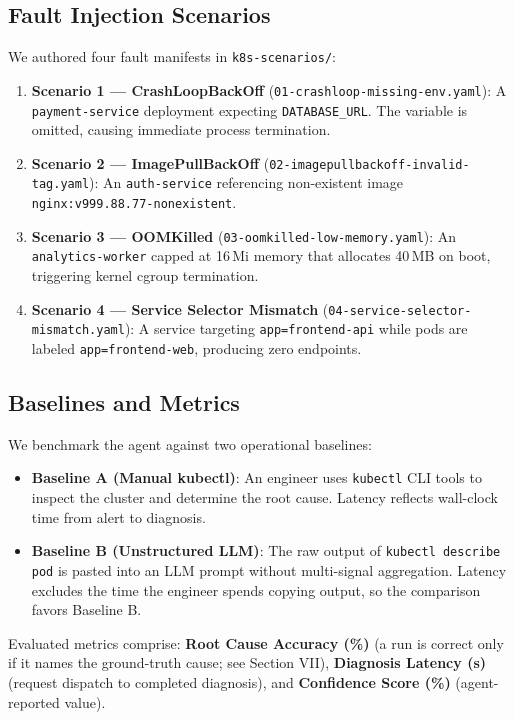 \documentclass[12pt,onecolumn,draftclsnofoot]{IEEEtran}
\begin{document}
\subsection{Fault Injection Scenarios}
We authored four fault manifests in \texttt{k8s-scenarios/}:
\begin{enumerate}
  \item \textbf{Scenario 1 — CrashLoopBackOff} (\texttt{01-crashloop-missing-env.yaml}): A \texttt{payment-service} deployment expecting \texttt{DATABASE\_URL}. The variable is omitted, causing immediate process termination.
  \item \textbf{Scenario 2 — ImagePullBackOff} (\texttt{02-imagepullbackoff-invalid-tag.yaml}): An \texttt{auth-service} referencing non-existent image \texttt{nginx:v999.88.77-nonexistent}.
  \item \textbf{Scenario 3 — OOMKilled} (\texttt{03-oomkilled-low-memory.yaml}): An \texttt{analytics-worker} capped at 16\,Mi memory that allocates 40\,MB on boot, triggering kernel cgroup termination.
  \item \textbf{Scenario 4 — Service Selector Mismatch} (\texttt{04-service-selector-mismatch.yaml}): A service targeting \texttt{app=frontend-api} while pods are labeled \texttt{app=frontend-web}, producing zero endpoints.
\end{enumerate}

\subsection{Baselines and Metrics}
We benchmark the agent against two operational baselines:
\begin{itemize}
  \item \textbf{Baseline A (Manual kubectl)}: An engineer uses \texttt{kubectl} CLI tools to inspect the cluster and determine the root cause. Latency reflects wall-clock time from alert to diagnosis.
  \item \textbf{Baseline B (Unstructured LLM)}: The raw output of \texttt{kubectl describe pod} is pasted into an LLM prompt without multi-signal aggregation. Latency excludes the time the engineer spends copying output, so the comparison favors Baseline B.
\end{itemize}

Evaluated metrics comprise: \textbf{Root Cause Accuracy (\%)} (a run is correct only if it names the ground-truth cause; see Section VII), \textbf{Diagnosis Latency (s)} (request dispatch to completed diagnosis), and \textbf{Confidence Score (\%)} (agent-reported value).
\end{document}
